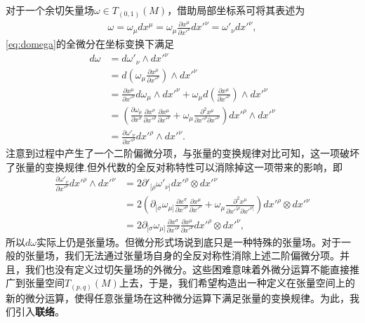 \documentclass[10pt]{article}
\begin{document}
	对于一个余切矢量场$\omega\in T_{(0,1)}(M)$，借助局部坐标系可将其表述为
	\begin{equation}\label{eq:domega}
		\begin{split}
			\omega=\omega_\mu dx^\mu=\omega_\mu\frac{\partial{x}^\mu}{\partial {x'}^\nu}d{x'}^\nu=\omega'_\nu d{x'}^\nu,
		\end{split}
	\end{equation}
	\ref{eq:domega}的全微分在坐标变换下满足
	\begin{equation}
		\begin{split}	
		d\omega &=d\omega'_\nu{\wedge}d{x'}^\nu\\
		&= d\left(\omega_\mu\frac{\partial{x}^\mu}{{\partial}{x'}^\nu}\right)\wedge d{x'}^\nu\\
		&=\frac{\partial{x}^\mu}{{\partial}{x'}^\nu}d\omega_\mu{\wedge}d{x'}^\nu+\omega_{\mu}d\left(\frac{\partial{x}^\mu}{\partial {x'}^\nu}\right){\wedge}d{x'}^\nu\\
		&=\left(\frac{\partial{\omega}_\mu}{{\partial}{x}^\sigma}\frac{\partial{x}^\sigma}{\partial {x'}^\rho}\frac{\partial{x}^\mu}{{\partial}{x'}^\nu}+{\omega}_\mu\frac{\partial^2{x}^\mu}{\partial {x'}^\rho{\partial}{x'}^\nu}\right)d{x'}^\rho{\wedge}d{x'}^\nu\\
		&=\frac{\partial\omega'_\nu}{{\partial}{x'}^\rho}d{x'}^\rho{\wedge}d{x'}^\nu.
		\end{split}
	\end{equation}
	注意到过程中产生了一个二阶偏微分项，与张量的变换规律对比可知，这一项破坏了张量的变换规律.但外代数的全反对称特性可以消除掉这一项带来的影响，即
	\begin{equation}
		\begin{split}
			\frac{\partial\omega'_\nu}{{\partial}{x'}^\rho}d{x'}^\rho{\wedge}d{x'}^\nu&=2\partial'_{[\rho}\omega'_{\nu]}{dx'}^{\rho}\otimes{dx'}^\nu\\
			&=2\left(\partial_{[\sigma}\omega_{\mu]}\frac{\partial{x}^\sigma}{\partial {x'}^\rho}\frac{\partial{x}^\mu}{{\partial}{x'}^\nu}+{\omega}_\mu\frac{\partial^2{x}^\mu}{\partial {x'}^{[\rho}{\partial}{x'}^{\nu]}}\right){dx'}^{\rho}\otimes{dx'}^\nu\\
		&=2\partial_{[\sigma}\omega_{\mu]}\frac{\partial{x}^\sigma}{\partial {x'}^\rho}\frac{\partial{x}^\mu}{{\partial}{x'}^\nu}{dx'}^{\rho}\otimes{dx'}^\nu,
		\end{split}
	\end{equation}
	所以$d\omega$实际上仍是张量场。但微分形式场说到底只是一种特殊的张量场。对于一般的张量场，我们无法通过张量场自身的全反对称性消除上述二阶偏微分项。并且，我们也没有定义过切矢量场的外微分。这些困难意味着外微分运算不能直接推广到张量空间$T_{(p,q)}(M)$上去，于是，我们希望构造出一种定义在张量空间上的新的微分运算，使得任意张量场在这种微分运算下满足张量的变换规律。为此，我们引入\textbf{联络}。
\end{document}
